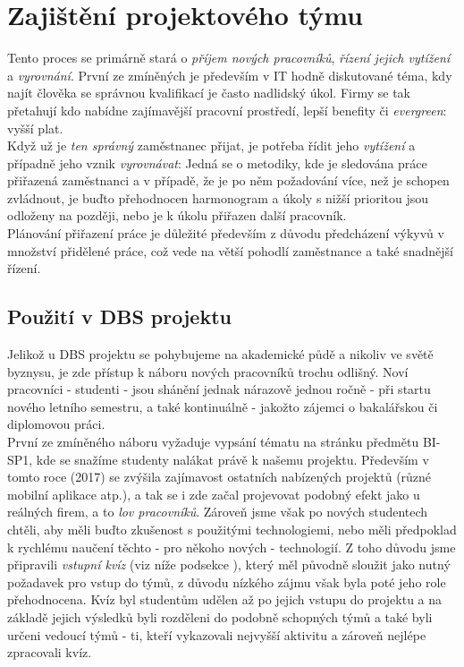 
\section{Zajištění projektového týmu}

Tento proces se primárně stará o \emph{příjem nových pracovníků}, \emph{řízení jejich vytížení} a \emph{vyrovnání}. První ze zmíněných je především v IT hodně diskutované téma, kdy najít člověka se správnou kvalifikací je často nadlidský úkol. Firmy se tak přetahují kdo nabídne zajímavější pracovní prostředí, lepší benefity či \emph{evergreen}: vyšší plat.\\
Když už je \emph{ten správný} zaměstnanec přijat, je potřeba řídit jeho \emph{vytížení} a případně jeho vznik \emph{vyrovnávat}: Jedná se o metodiky, kde je sledována práce přiřazená zaměstnanci a v případě, že je po něm požadování více, než je schopen zvládnout, je buďto přehodnocen harmonogram a úkoly s nižší prioritou jsou odloženy na později, nebo je k úkolu přiřazen další pracovník.\\
Plánování přiřazení práce je důležité především z důvodu předcházení výkyvů v množství přidělené práce, což vede na větší pohodlí zaměstnance a také snadnější řízení. 

\subsection{Použití v DBS projektu}
Jelikož u DBS projektu se pohybujeme na akademické půdě a nikoliv ve světě byznysu, je zde přístup k náboru nových pracovníků trochu odlišný. Noví pracovníci - studenti - jsou shánění jednak nárazově jednou ročně - při startu nového letního semestru, a také kontinuálně - jakožto zájemci o bakalářskou či diplomovou práci.\\
První ze zmíněného náboru vyžaduje vypsání tématu na stránku předmětu BI-SP1, kde se snažíme studenty nalákat právě k našemu projektu. Především v tomto roce (2017) se zvýšila zajímavost ostatních nabízených projektů (různé mobilní aplikace atp.), a tak se i zde začal projevovat podobný efekt jako u reálných firem, a to \emph{lov pracovníků}. Zároveň jsme však po nových studentech chtěli, aby měli buďto zkušenost s použitými technologiemi, nebo měli předpoklad k rychlému naučení těchto - pro někoho nových - technologií. Z toho důvodu jsme připravili \emph{vstupní kvíz} (viz níže podsekce ), který měl původně sloužit jako nutný požadavek pro vstup do týmů, z důvodu nízkého zájmu však byla poté jeho role přehodnocena. Kvíz byl studentům udělen až po jejich vstupu do projektu a na základě jejich výsledků byli rozděleni do podobně schopných týmů a také byli určeni vedoucí týmů - ti, kteří vykazovali nejvyšší aktivitu a zároveň nejlépe zpracovali kvíz.

